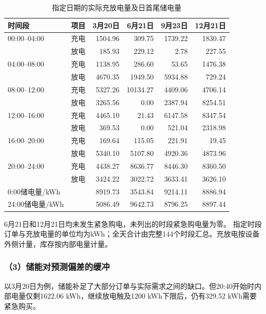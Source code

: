 \begin{table}[!htbp]
\centering
\caption{指定日期的实际充放电量及日首尾储电量}
\label{tab:q2_storage}
\begin{tabular}{llrrrr}
\hline
时间段 & 项目 & 3月20日 & 6月21日 & 9月23日 & 12月21日 \\
\hline
00:00--04:00 & 充电
& 1504.96 & 309.75 & 1739.22 & 1830.47 \\
& 放电
& 185.93 & 229.12 & 2.78 & 227.55 \\

04:00--08:00 & 充电
& 1138.95 & 286.60 & 53.65 & 1476.38 \\
& 放电
& 4670.35 & 1949.50 & 5934.88 & 729.24 \\

08:00--12:00 & 充电
& 5327.26 & 10134.27 & 4409.06 & 4706.14 \\
& 放电
& 3265.56 & 0.00 & 2387.94 & 8254.51 \\

12:00--16:00 & 充电
& 4465.10 & 21.43 & 6147.58 & 8347.54 \\
& 放电
& 369.53 & 0.00 & 521.04 & 2318.98 \\

16:00--20:00 & 充电
& 169.64 & 115.05 & 221.91 & 19.45 \\
& 放电
& 5340.10 & 5107.80 & 4920.36 & 4873.96 \\

20:00--24:00 & 充电
& 4438.27 & 8636.77 & 8446.30 & 8360.50 \\
& 放电
& 3424.22 & 3022.72 & 3633.41 & 3626.10 \\
\hline
0:00储电量/kWh & 
& 8919.73 & 3543.84 & 9214.11 & 8886.94 \\
24:00储电量/kWh &
& 5086.49 & 9642.73 & 8796.25 & 8897.44 \\
\hline
\end{tabular}
\end{table}



6月21日和12月21日均未发生紧急购电，未列出的时段紧急购电量为零。
指定时段订单与充放电量的单位均为kWh；全天合计由完整144个时段汇总。充放电按设备外侧计量，库存按内部电量计量。

\subsubsection*{（3）储能对预测偏差的缓冲}

以3月20日为例，储能补足了大部分订单与实际需求之间的缺口。但20:40开始时内部电量仅剩1622.06 kWh，继续放电触及1200 kWh下限后，仍有329.52 kWh需要紧急购买。

